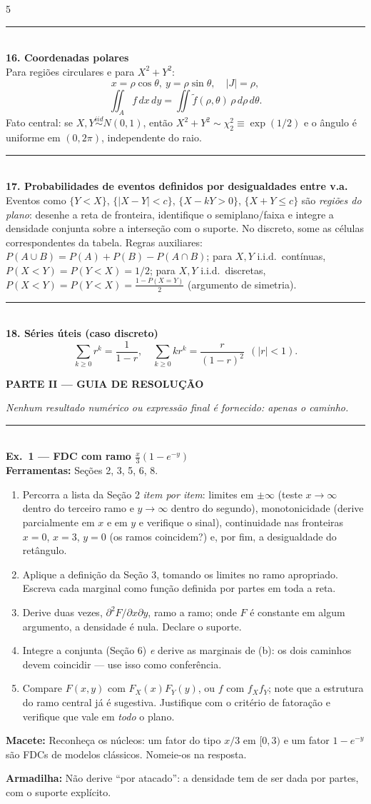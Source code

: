 \documentclass[a4paper,8pt]{extarticle}
\newcommand{\tit}[1]{\vspace{2pt}\textcolor{azul}{\rule{\linewidth}{0.6pt}}\\[1pt]\textbf{\textcolor{azul}{#1}}\\[1pt]}
\newcommand{\mac}[1]{\textcolor{verde}{\textbf{Macete:}} #1\par}
\newcommand{\arm}[1]{\textcolor{vinho}{\textbf{Armadilha:}} #1\par}
\newcommand{\ferr}[1]{\textbf{Ferramentas:} #1\par}
\newcommand{\ind}{\stackrel{iid}{\sim}}
\begin{document}
\begin{multicols*}{5}
\tit{16. Coordenadas polares}
Para regiões circulares e para $X^2+Y^2$:
\[x=\rho\cos\theta,\ y=\rho\sin\theta,\quad |J|=\rho,\]
\[\iint_A f\,dx\,dy=\iint \tilde f(\rho,\theta)\,\rho\,d\rho\,d\theta .\]
Fato central: se $X,Y\ind N(0,1)$, então $X^2+Y^2\sim\chi^2_2\equiv\exp(1/2)$ e o ângulo é uniforme em $(0,2\pi)$, independente do raio.

\tit{17. Probabilidades de eventos definidos por desigualdades entre v.a.}
Eventos como $\{Y<X\}$, $\{|X-Y|<c\}$, $\{X-kY>0\}$, $\{X+Y\le c\}$ são \emph{regiões do plano}: desenhe a reta de fronteira, identifique o semiplano/faixa e integre a densidade conjunta sobre a interseção com o suporte. No discreto, some as células correspondentes da tabela.
Regras auxiliares: $P(A\cup B)=P(A)+P(B)-P(A\cap B)$; para $X,Y$ i.i.d.\ contínuas, $P(X<Y)=P(Y<X)=1/2$; para $X,Y$ i.i.d.\ discretas, $P(X<Y)=P(Y<X)=\frac{1-P(X=Y)}{2}$ (argumento de simetria).

\tit{18. Séries úteis (caso discreto)}
\[\sum_{k\ge0}r^{k}=\frac{1}{1-r},\quad \sum_{k\ge0}k r^{k}=\frac{r}{(1-r)^2}\ \ (|r|<1).\]

\vspace{4pt}
\begin{center}\colorbox{cinza}{\parbox{0.94\linewidth}{\centering\bfseries\color{azul} PARTE II — GUIA DE RESOLUÇÃO}}\end{center}
\textit{Nenhum resultado numérico ou expressão final é fornecido: apenas o caminho.}

\tit{Ex.\ 1 — FDC com ramo $\frac{x}{3}(1-e^{-y})$}
\ferr{Seções 2, 3, 5, 6, 8.}
\begin{enumerate}
\item[(a)] Percorra a lista da Seção 2 \emph{item por item}: limites em $\pm\infty$ (teste $x\to\infty$ dentro do terceiro ramo e $y\to\infty$ dentro do segundo), monotonicidade (derive parcialmente em $x$ e em $y$ e verifique o sinal), continuidade nas fronteiras $x=0$, $x=3$, $y=0$ (os ramos coincidem?) e, por fim, a desigualdade do retângulo.
\item[(b)] Aplique a definição da Seção 3, tomando os limites no ramo apropriado. Escreva cada marginal como função definida por partes em toda a reta.
\item[(c)] Derive duas vezes, $\partial^2F/\partial x\partial y$, ramo a ramo; onde $F$ é constante em algum argumento, a densidade é nula. Declare o suporte.
\item[(d)] Integre a conjunta (Seção 6) \emph{e} derive as marginais de (b): os dois caminhos devem coincidir — use isso como conferência.
\item[(e)] Compare $F(x,y)$ com $F_X(x)F_Y(y)$, ou $f$ com $f_Xf_Y$; note que a estrutura do ramo central já é sugestiva. Justifique com o critério de fatoração e verifique que vale em \emph{todo} o plano.
\end{enumerate}
\mac{Reconheça os núcleos: um fator do tipo $x/3$ em $[0,3)$ e um fator $1-e^{-y}$ são FDCs de modelos clássicos. Nomeie-os na resposta.}
\arm{Não derive “por atacado”: a densidade tem de ser dada por partes, com o suporte explícito.}


\end{multicols*}
\end{document}
